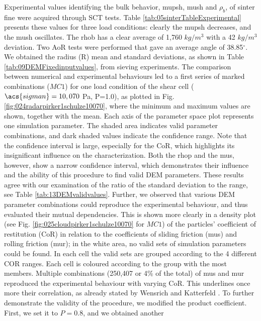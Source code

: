 Experimental values identifying the bulk behavior, \acs{mupsh}, \acs{mush} and $\rho_{b}$, 
of sinter fine were acquired through \acs{SCT} tests. 
Table \ref{tab:05sinterTableExperimental} presents
these values for three load conditions: clearly the \acs{mupsh} decreases, and 
the \acs{mush} oscillates.
The \acs{rhob} has a clear average of 1,760 $kg/m^3$ with a 42 
$kg/m^3$ deviation.
Two \acs{AoR} tests were performed that gave an average angle of
38.85$^\circ$.
We obtained the radius (\acs{R}) mean and standard
deviations, as shown in Table
\ref{tab:09DEMFixedinputvalues}, from sieving experiments.
The comparison between numerical and experimental behaviours led to a first
series of marked combinations ($MC1$) for one load condition of
the shear cell ($\acs{sigman} = 10,070$ Pa, P=1.0), as plotted in Fig.
\ref{fig:024radarpirker1schulze10070}, where 
the minimum and maximum values are shown, together with the mean. 
Each axis of the parameter space plot represents one simulation parameter.
The shaded area indicates valid parameter combinations, and dark shaded
values indicate the confidence range.
Note that the confidence interval is large, 
especially for the \acs{CoR}, which highlights its insignificant influence on the
characterization.
Both the \acs{rhop}  and the \acs{mus}, however, show a narrow confidence interval, 
which demonstrates their influence and the ability of this procedure to find
valid \acs{DEM} parameters.
These results agree with our examination of the ratio of the standard deviation
to the range, see Table \ref{tab:13DEMvalidvalues}.
Further, we observed that various \acs{DEM} parameter
combinations could reproduce the experimental behaviour, and thus evaluated
their mutual dependencies.
This is shown more clearly in a density plot (see Fig. 
\ref{fig:025cloudpirker1schulze10070} for $MC1$) 
of the particles' coefficient of restitution (\acs{CoR}) in relation to
the coefficients of sliding friction (\acs{mus}) and rolling friction (\acs{mur}); 
in the white area, no valid sets of simulation parameters could be found.
In each cell the valid sets are grouped according to the 4 different COR
ranges.
Each cell is coloured according to the group with the most members.
Multiple
combinations (250,407 or 4\% of the total) of \acs{mus} and \acs{mur} reproduced
the experimental behaviour with varying \acs{CoR}.
This underlines once more their correlation, as already stated by Wensrich and 
Katterfeld \cite{RefWorks:87}.
To further demonstrate the validity of the procedure, we modified the product
coefficient. 
First, we set it to $P=0.8$, and we obtained another
